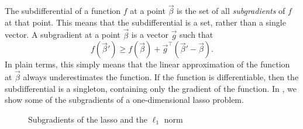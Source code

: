 The subdifferential of a function \(f\) at a point \(\vec{\beta}\) is the set of all \emph{subgradients} of \(f\) at that point. This means that the subdifferential is a set, rather than a single vector. A subgradient at a point \(\vec{\beta}\) is a vector \(\vec{g}\) such that
\[
  f(\vec{\beta}') \geq f(\vec{\beta}) + \vec{g}^\intercal (\vec{\beta}' - \vec{\beta}).
\]
In plain terms, this simply means that the linear approximation of the function at \(\vec{\beta}\) always underestimates the function. If the function is differentiable, then the subdifferential is a singleton, containing only the gradient of the function.
In , we show some of the subgradients of a one-dimensional lasso problem.

\begin{figure}[htpb]
  \centering
  \hfill%
  \hfill%
  \caption{%
    Subgradients of the lasso and the \(\ell_1\) norm
  }
\end{figure}


